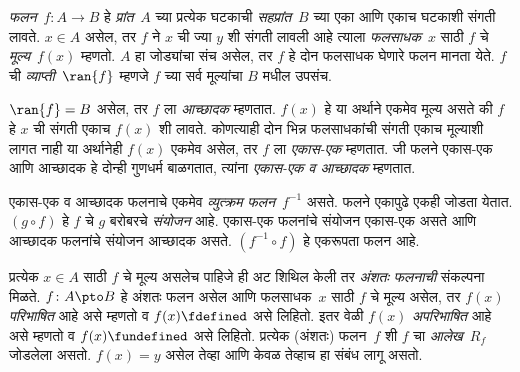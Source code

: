 \emph{फलन}~$f\colon A \to B$ हे \emph{प्रांत}~$A$ च्या प्रत्येक घटकाची \emph{सहप्रांत}~$B$ च्या एका आणि एकाच घटकाशी संगती लावते. $x \in A$ असेल, तर $f$ ने $x$ ची ज्या $y$ शी संगती लावली आहे त्याला \emph{फलसाधक}~$x$ साठी $f$ चे \emph{मूल्य}~$f(x)$ म्हणतो. $A$ हा जोड्यांचा संच असेल, तर $f$ हे दोन फलसाधक घेणारे फलन मानता येते. $f$ ची \emph{व्याप्ती}~$\ran{f}$ म्हणजे $f$ च्या सर्व मूल्यांचा $B$ मधील उपसंच.

$\ran{f} = B$ असेल, तर $f$ ला \emph{आच्छादक} म्हणतात. $f(x)$ हे या अर्थाने एकमेव मूल्य असते की $f$ हे $x$ ची संगती एकाच $f(x)$ शी लावते. कोणत्याही दोन भिन्न फलसाधकांची संगती एकाच मूल्याशी लागत नाही या अर्थानेही $f(x)$ एकमेव असेल, तर $f$ ला \emph{एकास-एक} म्हणतात. जी फलने एकास-एक आणि आच्छादक हे दोन्ही गुणधर्म बाळगतात, त्यांना \emph{एकास-एक व आच्छादक} म्हणतात.

एकास-एक व आच्छादक फलनाचे एकमेव \emph{व्युत्क्रम फलन}~$f^{-1}$ असते. फलने एकापुढे एकही जोडता येतात. $(g \circ f)$ हे $f$ चे $g$ बरोबरचे \emph{संयोजन} आहे. एकास-एक फलनांचे संयोजन एकास-एक असते आणि आच्छादक फलनांचे संयोजन आच्छादक असते. $(f^{-1} \circ f)$ हे एकरूपता फलन आहे.

प्रत्येक $x \in A$ साठी $f$ चे मूल्य असलेच पाहिजे ही अट शिथिल केली तर \emph{अंशतः फलनाची} संकल्पना मिळते. $f\colon A \pto B$ हे अंशतः फलन असेल आणि फलसाधक~$x$ साठी $f$ चे मूल्य असेल, तर $f(x)$ \emph{परिभाषित} आहे असे म्हणतो व $f(x) \fdefined$ असे लिहितो. इतर वेळी $f(x)$ \emph{अपरिभाषित} आहे असे म्हणतो व $f(x) \fundefined$ असे लिहितो. प्रत्येक (अंशतः) फलन~$f$ शी $f$ चा \emph{आलेख}~$R_f$ जोडलेला असतो. $f(x) = y$ असेल तेव्हा आणि केवळ तेव्हाच हा संबंध लागू असतो.
